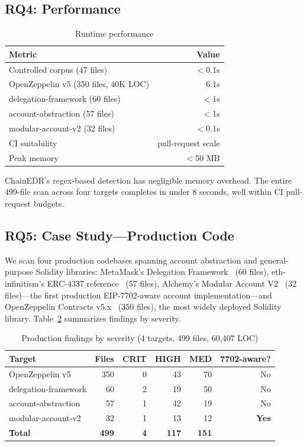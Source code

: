 \subsection{RQ4: Performance}

\begin{table}[h]
\centering
\caption{Runtime performance}
\label{tab:performance}
\begin{tabular}{lr}
\hline
\textbf{Metric} & \textbf{Value} \\
\hline
Controlled corpus (47 files) & $<$0.1s \\
OpenZeppelin v5 (350 files, 40K LOC) & 6.1s \\
delegation-framework (60 files) & $<$1s \\
account-abstraction (57 files) & $<$1s \\
modular-account-v2 (32 files) & $<$0.1s \\
CI suitability & pull-request scale \\
Peak memory & $<$50 MB \\
\hline
\end{tabular}
\end{table}

ChainEDR's regex-based detection has negligible memory overhead. The entire 499-file scan across four targets completes in under 8 seconds, well within CI pull-request budgets.

\subsection{RQ5: Case Study---Production Code}

We scan four production codebases spanning account abstraction and general-purpose Solidity libraries: MetaMask's Delegation Framework~\cite{metamask_delegation} (60 files), eth-infinitism's ERC-4337 reference~\cite{eth_infinitism} (57 files), Alchemy's Modular Account V2~\cite{alchemy_modular} (32 files)---the first production EIP-7702-aware account implementation---and OpenZeppelin Contracts v5.x~\cite{oz_contracts} (350 files), the most widely deployed Solidity library. Table~\ref{tab:casestudy} summarizes findings by severity.

\begin{table}[h]
\centering
\caption{Production findings by severity (4 targets, 499 files, 60{,}407 LOC)}
\label{tab:casestudy}
\begin{tabular}{lrrrrr}
\hline
\textbf{Target} & \textbf{Files} & \textbf{CRIT} & \textbf{HIGH} & \textbf{MED} & \textbf{7702-aware?} \\
\hline
OpenZeppelin v5         & 350 &  0 & 43 &  70 & No \\
delegation-framework    &  60 &  2 & 19 &  50 & No \\
account-abstraction     &  57 &  1 & 42 &  19 & No \\
modular-account-v2      &  32 &  1 & 13 &  12 & \textbf{Yes} \\
\hline
\textbf{Total}          & \textbf{499} & \textbf{4} & \textbf{117} & \textbf{151} & \\
\hline
\end{tabular}
\end{table}

